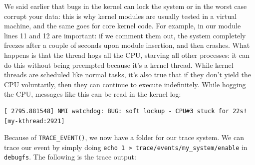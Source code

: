 \documentclass[10pt, oneside]{book}
\begin{document}
We said earlier that bugs in the kernel can lock the system or in the worst case corrupt your data: this is why kernel modules are usually tested in a virtual machine, and the same goes for core kernel code. For example, in our module lines 11 and 12 are important: if we comment them out, the system completely freezes after a couple of seconds upon module insertion, and then crashes. What happens is that the thread hogs all the CPU, starving all other processes: it can do this without being preempted because it's a kernel thread. While kernel threads are scheduled like normal tasks, it's also true that if they don't yield the CPU voluntarily, then they can continue to execute indefinitely. %
While hogging the CPU, messages like this can be read in the kernel log:
\begin{Verbatim}
[ 2795.881548] NMI watchdog: BUG: soft lockup - CPU#3 stuck for 22s! [my-kthread:2921]    
\end{Verbatim}
Because of \verb|TRACE_EVENT()|, we now have a folder for our trace system. We can trace our event by simply doing \verb|echo 1 > trace/events/my_system/enable| in \verb|debugfs|. The following is the trace output:
\end{document}
